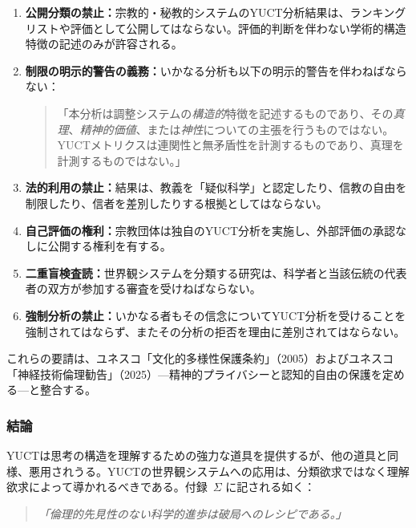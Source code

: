 \documentclass[11pt,a4paper]{article}
\begin{document}
	\begin{enumerate}[label=(\arabic*)]
		\item \textbf{公開分類の禁止：}宗教的・秘教的システムのYUCT分析結果は、ランキングリストや評価として公開してはならない。評価的判断を伴わない学術的構造特徴の記述のみが許容される。
		
		\item \textbf{制限の明示的警告の義務：}いかなる分析も以下の明示的警告を伴わねばならない：
		\begin{quote}
			「本分析は調整システムの\emph{構造的}特徴を記述するものであり、その\emph{真理}、\emph{精神的価値}、または\emph{神性}についての主張を行うものではない。YUCTメトリクスは連関性と無矛盾性を計測するものであり、真理を計測するものではない。」
		\end{quote}
		
		\item \textbf{法的利用の禁止：}結果は、教義を「疑似科学」と認定したり、信教の自由を制限したり、信者を差別したりする根拠としてはならない。
		
		\item \textbf{自己評価の権利：}宗教団体は独自のYUCT分析を実施し、外部評価の承認なしに公開する権利を有する。
		
		\item \textbf{二重盲検査読：}世界観システムを分類する研究は、科学者と当該伝統の代表者の双方が参加する審査を受けねばならない。
		
		\item \textbf{強制分析の禁止：}いかなる者もその信念についてYUCT分析を受けることを強制されてはならず、またその分析の拒否を理由に差別されてはならない。
	\end{enumerate}
	
	これらの要請は、ユネスコ「文化的多様性保護条約」（2005）およびユネスコ「神経技術倫理勧告」（2025）—精神的プライバシーと認知的自由の保護を定める—と整合する。
	
	\subsubsection{結論}
	
	YUCTは思考の構造を理解するための強力な道具を提供するが、他の道具と同様、悪用されうる。YUCTの世界観システムへの応用は、分類欲求ではなく理解欲求によって導かれるべきである。付録~$\Sigma$ に記される如く：
	
	\begin{quote}
		\itshape
		「倫理的先見性のない科学的進歩は破局へのレシピである。」
	\end{quote}
	
\end{document}
